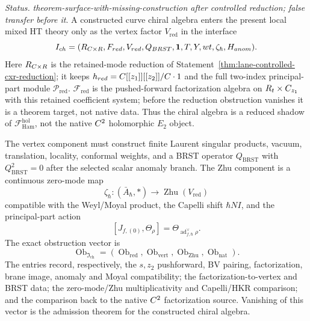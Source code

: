 \begin{stmt}\label{thm:lane-constructed-chiral-interface}
  \emph{Status.} \emph{theorem-surface-with-missing-construction after
  controlled reduction; false transfer before it}.  A constructed curve
  chiral algebra enters the present local mixed HT theory only as the
  vertex factor \(V_{\mathrm{red}}\) in the interface
  \[
    I_{ch}
    =
    (R_{C\times R},
     F_{red},
     V_{red},
     Q_{BRST},
     \mathbf 1,T,Y,wt,
     \zeta_\hbar,H_{anom}).
  \]
  Here \(R_{C\times R}\) is the retained-mode reduction of
  Statement~\ref{thm:lane-controlled-cxr-reduction}; it keeps
  \(h_{red}=C[[z_1]][[z_2]]/C\cdot1\) and the full
  two-index principal-part module \(\mathcal P_{\mathrm{red}}\).
  \(\mathcal F_{\mathrm{red}}\) is the pushed-forward factorization
  algebra on \(R_t\times C_{z_1}\) with this retained coefficient
  system; before the reduction obstruction vanishes it is a theorem
  target, not native data.  Thus
  the chiral algebra is a reduced shadow of
  \(\mathcal F_{\mathrm{Ham}}^{\mathrm{hol}}\), not the native
  \(C^2\) holomorphic \(E_2\) object.

  The vertex component must construct finite Laurent singular products,
  vacuum, translation, locality, conformal weights, and a BRST operator
  \(Q_{\mathrm{BRST}}\) with \(Q_{\mathrm{BRST}}^2=0\) after the selected
  scalar anomaly branch.  The Zhu component is a continuous zero-mode map
  \[
    \zeta_\hbar\colon(\bar A_\hbar,*)\longrightarrow
    \operatorname{Zhu}(V_{\mathrm{red}})
  \]
  compatible with the Weyl/Moyal product, the Capelli shift
  \(\hbar NI\), and the principal-part action
  \[
    [J_{f,(0)},\Theta_\rho]
    =
    \Theta_{\operatorname{ad}^{\vee}_{f,\hbar}\rho}.
  \]
  The exact obstruction vector is
  \[
    \operatorname{Ob}_{\mathfrak I_{\mathrm{ch}}}
    =
    (\operatorname{Ob}_{\mathrm{red}},
     \operatorname{Ob}_{\mathrm{vert}},
     \operatorname{Ob}_{\mathrm{Zhu}},
     \operatorname{Ob}_{\mathrm{nat}}).
  \]
  The entries record, respectively, the \(s,z_2\) pushforward, BV
  pairing, factorization, brane image, anomaly and Moyal compatibility;
  the factorization-to-vertex and BRST data; the zero-mode/Zhu
  multiplicativity and Capelli/HKR comparison; and the comparison back to
  the native \(C^2\) factorization source.  Vanishing of this vector is
  the admission theorem for the constructed chiral algebra.
\end{stmt}

